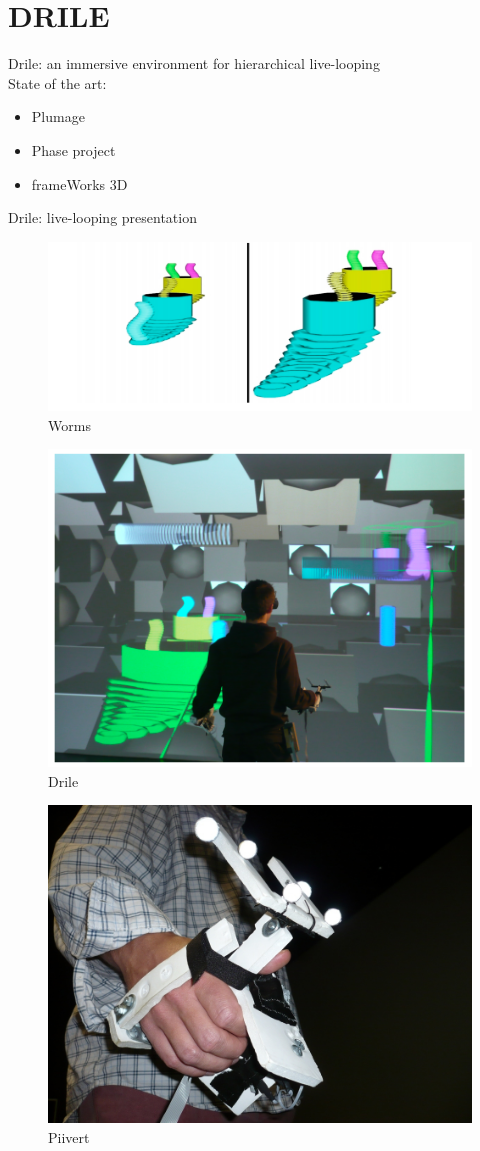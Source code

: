 \section{DRILE}
\begin{frame}
Drile: an immersive environment for hierarchical live-looping
\\
State of the art:
\begin{itemize}
\item Plumage
\item Phase project
\item frameWorks 3D
\end{itemize}
\end{frame}

\begin{frame}
Drile: live-looping presentation 
\end{frame}

\begin{frame}
\begin{figure}[ht]
	\centering
	\includegraphics[keepaspectratio,height=.2\linewidth,position=!h]{worms.png}
	\caption{Worms}
\end{figure}
\end{frame}

\begin{frame}
\begin{figure}[ht]
	\centering
	\includegraphics[keepaspectratio,height=.4\linewidth,position=!h]{drile.png}
	\caption{Drile}
\end{figure}
\end{frame}


\begin{frame}
\begin{figure}[ht]
	\centering
	\includegraphics[keepaspectratio,height=.4\linewidth,position=!h]{PIIVERT.jpg}
	\caption{Piivert}
\end{figure}
\end{frame}

